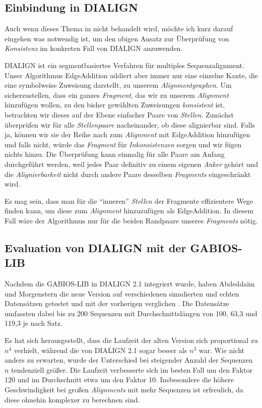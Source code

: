 \subsection{Einbindung in DIALIGN}

Auch wenn dieses Thema in \cite{am00} nicht behandelt wird, möchte ich kurz darauf eingehen was notwendig ist, um den obigen Ansatz zur Überprüfung von \emph{Konsistenz} im konkreten Fall von DIALIGN anzuwenden. 

DIALIGN ist ein segmentbasiertes Verfahren für multiples Sequenzalignment. Unser Algorithmus \textrm{EdgeAddition} addiert aber immer nur eine einzelne Kante, die eine symbolweise Zuweisung darstellt, zu unserem \emph{Alignmentgraphen}. Um sicherzustellen, dass ein ganzes \emph{Fragment}, das wir zu unserem \emph{Alignment} hinzufügen wollen, zu den bisher gewählten Zuweisungen \emph{konsistent} ist, betrachten wir dieses auf der Ebene einfacher Paare von \emph{Stellen}. Zunächst überprüfen wir für alle \emph{Stellenpaare} nacheinander, ob diese alignierbar sind. Falls ja, können wir sie der Reihe nach zum \emph{Alignment} mit \textrm{EdgeAddition} hinzufügen und falls nicht, würde das \emph{Fragment} für \emph{Inkonsistenzen} sorgen und wir fügen nichts hinzu. Die Überprüfung kann einmalig für alle Paare am Anfang durchgeführt werden, weil jedes Paar definitiv zu einem eigenen \emph{Anker} gehört und die \emph{Alignierbarkeit} nicht durch andere Paare desselben \emph{Fragments} eingeschränkt wird.

Es mag sein, dass man für die \enquote{inneren} \emph{Stellen} der Fragmente effizientere Wege finden kann, um diese zum \emph{Alignment} hinzuzufügen als \textrm{EdgeAddition}. In diesem Fall wäre der Algorithmus nur für die beiden Randpaare unseres \emph{Fragments} nötig.

\subsection{Evaluation von DIALIGN mit der GABIOS-LIB}

Nachdem die GABIOS-LIB in DIALIGN 2.1 integriert wurde, haben Abdedda\"im und Morgenstern die neue Version auf verschiedenen simulierten und echten Datensätzen getestet und mit der vorherigen verglichen \citep{am00}. Die Datensätze umfassten dabei bis zu 200 Sequenzen mit Durchschnittslängen von 100, 63,3 und 119,3 je nach Satz. 

Es hat sich herausgestellt, dass die Laufzeit der alten Version sich proportional zu $n^4$ verhielt, während die von DIALIGN 2.1 sogar besser als $n^3$ war. Wie nicht anders zu erwarten, wurde der Unterschied bei steigender Anzahl der Sequenzen $n$ tendenziell größer. Die Laufzeit verbesserte sich im besten Fall um den Faktor 120 und im Durchschnitt etwa um den Faktor 10. Insbesondere die höhere Geschwindigkeit bei großen \emph{Alignments} mit mehr Sequenzen ist erfreulich, da diese ohnehin komplexer zu berechnen sind.

